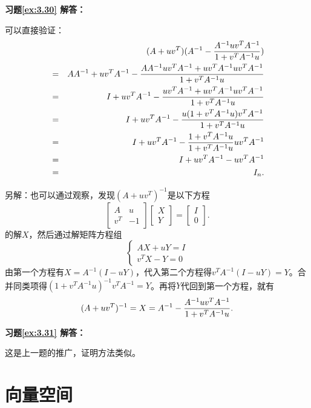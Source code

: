 \documentclass[a4paper]{book}
\begin{document}
\vspace{1.5em}

\textbf{习题\ref{ex:3.30} 解答：}

可以直接验证：
\begin{eqnarray*}
& & (A+uv^T) (A^{-1} - {A^{-1}uv^T A^{-1} \over 1 + v^T A^{-1}u}) \\
& = & AA^{-1} +  uv^T A^{-1} - {AA^{-1}uv^T A^{-1} + uv^T A^{-1}uv^T A^{-1} \over 1 + v^TA^{-1}u} \\
& = & I +  uv^T A^{-1} - {uv^T A^{-1} + uv^T A^{-1}uv^T A^{-1} \over 1 + v^T A^{-1}u} \\
& = & I + uv^T A^{-1} - {u(1 + v^T A^{-1}u) v^T A^{-1} \over 1 + v^T A^{-1}u} \\
& = & I + uv^T A^{-1} - {1 + v^T A^{-1}u \over 1 + v^T A^{-1}u}uv^T A^{-1} \\
& = & I + uv^T A^{-1} - uv^T A^{-1} \\
& = & I_n.
\end{eqnarray*}

另解：也可以通过观察，发现$(A+uv^T)^{-1}$是以下方程
$$\begin{bmatrix} A & u \\ v^T & -1 \end{bmatrix}\begin{bmatrix} X \\ Y \end{bmatrix} = \begin{bmatrix} I \\ 0 \end{bmatrix}.$$
的解$X$，然后通过解矩阵方程组
$$\begin{cases}
AX + uY = I \\
v^TX - Y = 0
\end{cases}$$
由第一个方程有$X = A^{-1}(I-uY)$，代入第二个方程得$v^TA^{-1}(I-uY) = Y$。合并同类项得$(1 + v^TA^{-1}u)^{-1}v^TA^{-1} = Y$。再将$Y$代回到第一个方程，就有
$$(A+uv^T)^{-1} = X = A^{-1} - {A^{-1}uv^T A^{-1} \over 1 + v^T A^{-1}u}.$$

\vspace{1.5em}

\textbf{习题\ref{ex:3.31} 解答：}

这是上一题的推广，证明方法类似。


\chapter{向量空间}
\end{document}
